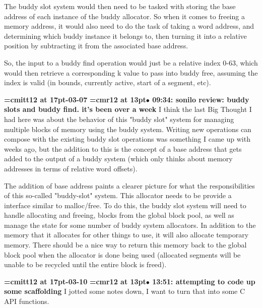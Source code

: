 The buddy slot system would then need to be tasked with storing the base address of each instance of the buddy allocator. So when it comes to freeing a memory address, it would also need to do the task of taking a word address, and determining which buddy instance it belongs to, then turning it into a relative position by subtracting it from the associated base address.
\par

So, the input to a buddy find operation would just be a relative index 0-63, which would then retrieve a corresponding k value to pass into buddy free, assuming the index is valid (in bounds, currently active, start of a segment, etc).
\par

{\medskip\noindent\bf\font\titlefont=cmitt12 at 17pt-03-07}\medskip
{\smallskip\noindent\bf\font\titlefont=cmr12 at 13pt\titlefont $\bullet$ 09:34: sonilo review: buddy slots and buddy find. it's been over a week}\smallskip
I think the last Big Thought I had here was about the behavior of this "buddy slot" system for managing multiple blocks of memory using the buddy system. Writing new operations can compose with the existing buddy slot operations was something I came up with weeks ago, but the addition to this is the concept of a base address that gets added to the output of a buddy system (which only thinks about memory addresses in terms of relative word offsets).
\par

The addition of base address paints a clearer picture for what the responsibilities of this so-called "buddy-slot" system. This allocator needs to be provide a interface similar to malloc/free. To do this, the buddy slot system will need to handle allocating and freeing, blocks from the global block pool, as well as manage the state for some number of buddy system allocators. In addition to the memory that it allocates for other things to use, it will also allocate temporary memory. There should be a nice way to return this memory back to the global block pool when the allocator is done being used (allocated segments will be unable to be recycled until the entire block is freed).
\par

{\medskip\noindent\bf\font\titlefont=cmitt12 at 17pt-03-10}\medskip
{\smallskip\noindent\bf\font\titlefont=cmr12 at 13pt\titlefont $\bullet$ 13:51: attempting to code up some scaffolding}\smallskip
I jotted some notes down, I want to turn that into some C API functions.
\par

